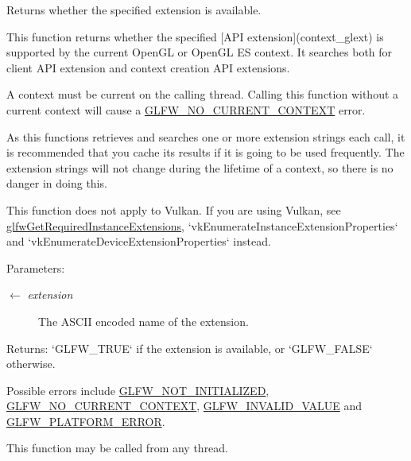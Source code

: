 Returns whether the specified extension is available. 

This function returns whether the specified \mbox{[}API extension\mbox{]}(context\_\-glext) is supported by the current OpenGL or OpenGL ES context. It searches both for client API extension and context creation API extensions.

A context must be current on the calling thread. Calling this function without a current context will cause a \hyperlink{group__errors_ga8290386e9528ccb9e42a3a4e16fc0d0}{GLFW\_\-NO\_\-CURRENT\_\-CONTEXT} error.

As this functions retrieves and searches one or more extension strings each call, it is recommended that you cache its results if it is going to be used frequently. The extension strings will not change during the lifetime of a context, so there is no danger in doing this.

This function does not apply to Vulkan. If you are using Vulkan, see \hyperlink{group__vulkan_g70adaf0cfc99adc484c49ea99e17c2cf}{glfwGetRequiredInstanceExtensions}, `vkEnumerateInstanceExtensionProperties` and `vkEnumerateDeviceExtensionProperties` instead.

\begin{Desc}
\item[Parameters:]
\begin{description}
\item[\mbox{$\leftarrow$} {\em extension}]The ASCII encoded name of the extension. \end{description}
\end{Desc}
\begin{Desc}
\item[Returns:]`GLFW\_\-TRUE` if the extension is available, or `GLFW\_\-FALSE` otherwise.\end{Desc}
Possible errors include \hyperlink{group__errors_g2374ee02c177f12e1fa76ff3ed15e14a}{GLFW\_\-NOT\_\-INITIALIZED}, \hyperlink{group__errors_ga8290386e9528ccb9e42a3a4e16fc0d0}{GLFW\_\-NO\_\-CURRENT\_\-CONTEXT}, \hyperlink{group__errors_gaf2ef9aa8202c2b82ac2d921e554c687}{GLFW\_\-INVALID\_\-VALUE} and \hyperlink{group__errors_gd44162d78100ea5e87cdd38426b8c7a1}{GLFW\_\-PLATFORM\_\-ERROR}.

This function may be called from any thread.

